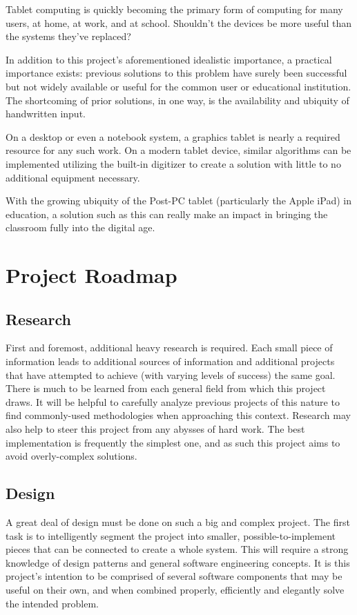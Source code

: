 \documentclass{acm_proc_article-sp}
\begin{document}
Tablet computing is quickly becoming the primary form of computing for many users, at home, at work, and at school. Shouldn't the devices be more useful than the systems they've replaced?

In addition to this project's aforementioned idealistic importance, a practical importance exists: previous solutions to this problem have surely been successful but not widely available or useful for the common user or educational institution. The shortcoming of prior solutions, in one way, is the availability and ubiquity of handwritten input. 

On a desktop or even a notebook system, a graphics tablet is nearly a required resource for any such work. On a modern tablet device, similar algorithms can be implemented utilizing the built-in digitizer to create a solution with little to no additional equipment necessary. 

With the growing ubiquity of the Post-PC tablet (particularly the Apple iPad) in education, a solution such as this can really make an impact in bringing the classroom fully into the digital age.

\section{Project Roadmap}

\subsection{Research}
First and foremost, additional heavy research is required. Each small piece of information leads to additional sources of information and additional projects that have attempted to achieve (with varying levels of success) the same goal. There is much to be learned from each general field from which this project draws. It will be helpful to carefully analyze previous projects of this nature to find commonly-used methodologies when approaching this context. Research may also help to steer this project from any abysses of hard work. The best implementation is frequently the simplest one, and as such this project aims to avoid overly-complex solutions.

\subsection{Design}
A great deal of design must be done on such a big and complex project. The first task is to intelligently segment the project into smaller, possible-to-implement pieces that can be connected to create a whole system. This will require a strong knowledge of design patterns and general software engineering concepts. It is this project's intention to be comprised of several software components that may be useful on their own, and when combined properly, efficiently and elegantly solve the intended problem.
\end{document}
